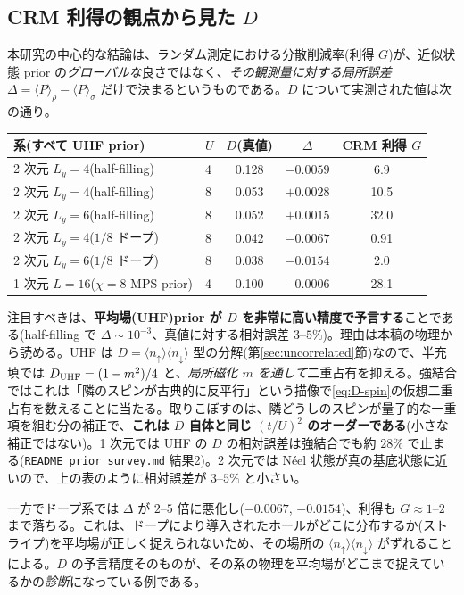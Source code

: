 \documentclass[11pt,a4paper]{ltjsarticle}
\newcommand{\ev}[1]{\langle #1\rangle}
\newcommand{\up}{\uparrow}
\newcommand{\dn}{\downarrow}
\begin{document}
\subsection{CRM 利得の観点から見た $D$}
本研究の中心的な結論は、ランダム測定における分散削減率(利得 $G$)が、近似状態 prior の\emph{グローバルな}良さではなく、\emph{その観測量に対する局所誤差} $\Delta=\ev{P}_\rho-\ev{P}_\sigma$ だけで決まるというものである。$D$ について実測された値は次の通り。

\begin{center}\small
\begin{tabular}{@{}llccc@{}}
\toprule
系(すべて UHF prior) & $U$ & $D$(真値) & $\Delta$ & CRM 利得 $G$ \\
\midrule
2 次元 $L_y=4$(half-filling) & 4 & 0.128 & $-0.0059$ & 6.9 \\
2 次元 $L_y=4$(half-filling) & 8 & 0.053 & $+0.0028$ & 10.5 \\
2 次元 $L_y=6$(half-filling) & 8 & 0.052 & $+0.0015$ & 32.0 \\
2 次元 $L_y=4$($1/8$ ドープ) & 8 & 0.042 & $-0.0067$ & 0.91 \\
2 次元 $L_y=6$($1/8$ ドープ) & 8 & 0.038 & $-0.0154$ & 2.0 \\
\midrule
1 次元 $L=16$($\chi{=}8$ MPS prior) & 4 & 0.100 & $-0.0006$ & 28.1 \\
\bottomrule
\end{tabular}
\end{center}

注目すべきは、\textbf{平均場(UHF)prior が $D$ を非常に高い精度で予言する}ことである(half-filling で $\Delta\sim10^{-3}$、真値に対する相対誤差 $3$--$5\%$)。理由は本稿の物理から読める。UHF は $D=\ev{n_\up}\ev{n_\dn}$ 型の分解(第\ref{sec:uncorrelated}節)なので、半充填では $D_{\rm UHF}=(1-m^2)/4$ と、\emph{局所磁化 $m$ を通して}二重占有を抑える。強結合ではこれは「隣のスピンが古典的に反平行」という描像で\eqref{eq:D-spin}の仮想二重占有を数えることに当たる。取りこぼすのは、隣どうしのスピンが量子的な一重項を組む分の補正で、\textbf{これは $D$ 自体と同じ $(t/U)^2$ のオーダーである}(小さな補正ではない)。1 次元では UHF の $D$ の相対誤差は強結合でも約 $28\%$ で止まる(\texttt{README\_prior\_survey.md} 結果2)。2 次元では Néel 状態が真の基底状態に近いので、上の表のように相対誤差が $3$--$5\%$ と小さい。

一方でドープ系では $\Delta$ が $2$--$5$ 倍に悪化し($-0.0067$, $-0.0154$)、利得も $G\approx1$--$2$ まで落ちる。これは、ドープにより導入されたホールがどこに分布するか(ストライプ)を平均場が正しく捉えられないため、その場所の $\ev{n_\up}\ev{n_\dn}$ がずれることによる。$D$ の予言精度そのものが、その系の物理を平均場がどこまで捉えているかの\emph{診断}になっている例である。
\end{document}
